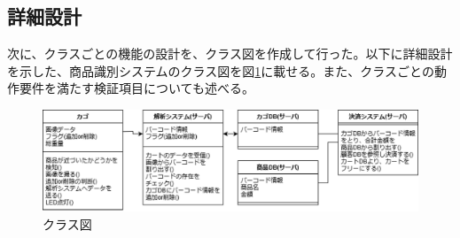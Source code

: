 \subsection*{詳細設計}

次に、クラスごとの機能の設計を、クラス図を作成して行った。以下に詳細設計を示した、商品識別システムのクラス図\cite{v_model}を図\ref{class}に載せる。また、クラスごとの動作要件を満たす検証項目についても述べる。
\begin{figure}[htbp]
\centering
\includegraphics[width=15cm]{./pic/class_final.eps}
\caption{クラス図}
\label{class}
\end{figure}

